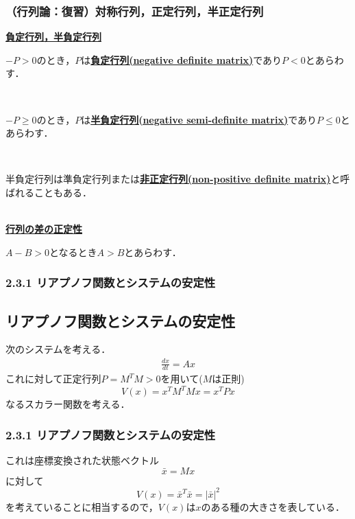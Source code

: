 \begin{frame}[t]
\frametitle{（行列論：復習）対称行列，正定行列，半正定行列}

\noindent
{\bf \underline{負定行列，半負定行列}}

$-P > 0$のとき，$P$は{\bf \underline{負定行列(negative definite matrix)}}であり$P<0$とあらわす．

\ 

$-P \geq 0$のとき，$P$は{\bf \underline{半負定行列(negative semi-definite matrix)}}であり$P \leq 0$とあらわす．

\ 

半負定行列は準負定行列または{\bf \underline{非正定行列(non-positive definite matrix)}}と呼ばれることもある．\\

\ 

\noindent
{\bf \underline{行列の差の正定性}}

$A-B>0$となるとき$A>B$とあらわす．

\end{frame}



\begin{frame}[t]
\frametitle{2.3.1 リアプノフ関数とシステムの安定性}

\subsection{リアプノフ関数とシステムの安定性}

\noindent
次のシステムを考える．
\begin{eqnarray}
	\frac{d x}{dt} = A x
\end{eqnarray}
これに対して正定行列$P=M^T M>0$を用いて($M$は正則)
\begin{equation}
 V(x) = x^T M^T M x = x^T P x
\end{equation}
なるスカラー関数を考える．
\end{frame}

\begin{frame}[t]
\frametitle{2.3.1 リアプノフ関数とシステムの安定性}
これは座標変換された状態ベクトル
\begin{equation}
 \bar{x} = M x
\end{equation}
に対して
\begin{equation}
 V(x) = \bar{x}^T \bar{x} = \vert \bar{x} \vert ^2
\end{equation}
を考えていることに相当するので，$V(x)$は$x$のある種の大きさを表している．

\end{frame}

